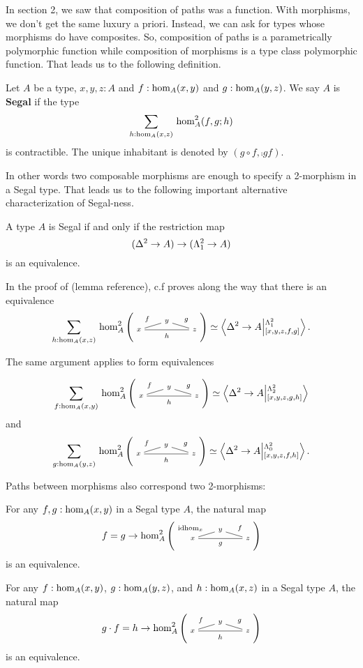 \documentclass[main.tex]{subfiles}
\begin{document}
In section 2, we saw that composition of paths was a function. With morphisms, we don't get the same luxury a priori. Instead, we can ask for types whose morphisms do have composites. So, composition of paths is a parametrically polymorphic function while composition of morphisms is a type class polymorphic function. That leads us to the following definition.
\begin{definition}\label{def:def3.3}
    Let $A$ be a type, $x,y,z : A$ and $f : \ho[A]{x}{y}$ and $g : \ho[A]{y}{z}$. We say $A$ is \textbf{Segal} if the type $${\sm{h : \ho[A]{x}{z}} \hot[A]{f}{g}{h}} $$
    is contractible. The unique inhabitant is denoted by $(g\circ f, \comp{g}{f}).$
\end{definition}

In other words two composable morphisms are enough to specify a 2-morphism in a Segal type. That leads us to the following important alternative characterization of Segal-ness.

\begin{lemma}
A type $A$ is Segal if and only if the restriction map
$$
(\tsx \to A) \to (\tohorn \to A) 
$$
is an equivalence. 
\end{lemma}
\begin{remark}
    In the proof of (lemma reference), c.f proves along the way that there is an equivalence
    \begin{equation}
        \sm{h : \ho[A]{x}{z}}\homtwo{A}(x,y,z,f,g,h) \simeq \ndexten{\tsx}{A}{\tohorn}{[x,y,z,f,g]}.
    \end{equation}

    \noindent The same argument applies to form equivalences 

    \begin{equation}
        \label{rem:sumoverfistt}
    \sm{f : \ho[A]{x}{y}}\homtwo{A}(x,y,z,f,g,h) \simeq \ndexten{\tsx}{A}{\tthorn}{[x,y,z,g,h]}
    \end{equation}
    and
    \begin{equation}
    \sm{g : \ho[A]{y}{z}}\homtwo{A}(x,y,z,f,g,h) \simeq \ndexten{\tsx}{A}{\tzhorn}{[x,y,z,f,h]}.
    \end{equation}
\end{remark}
Paths between morphisms also correspond two 2-morphisms:
\begin{lemma}
    \label{lem:pathis2mor}
    For any $f,g : \ho[A]{x}{y}$ in a Segal type $A$, the natural map
    $$f = g \to \homtwo{A}(x,y,z, \idhom{x}, f,g)$$
    is an equivalence.
\end{lemma}
\begin{lemma}
    \label{lem:compequalis2mor}
    For any $f: \ho[A]{x}{y}$, $g : \ho[A]{y}{z}$, and $h : \ho[A]{x}{z}$ in a Segal type $A$, the natural map
    $$g \cdot f = h \to \homtwo{A}(x,y,z,f,g,h)$$
    is an equivalence.
\end{lemma}
\end{document}
